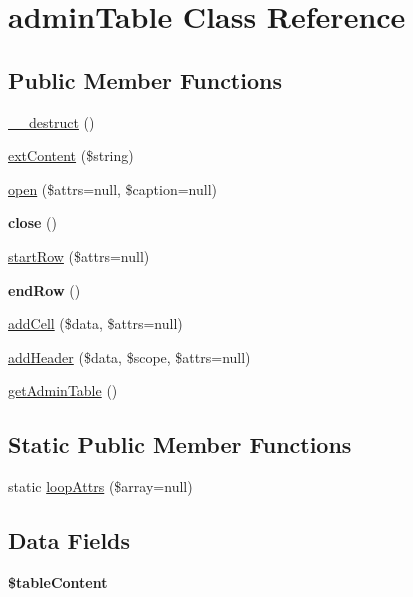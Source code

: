 \hypertarget{classadmin_table}{\section{admin\-Table Class Reference}
\label{classadmin_table}
}
\subsection*{Public Member Functions}
\begin{DoxyCompactItemize}
\item 
\hyperlink{classadmin_table_a421831a265621325e1fdd19aace0c758}{\-\_\-\-\_\-destruct} ()
\item 
\hyperlink{classadmin_table_afc8bf0c1f21257cd2d21b35b5dbc8d1d}{ext\-Content} (\$string)
\item 
\hyperlink{classadmin_table_a651d5c29adc27cf6b70fa3933be19e65}{open} (\$attrs=null, \$caption=null)
\item 
\hypertarget{classadmin_table_aa69c8bf1f1dcf4e72552efff1fe3e87e}{{\bfseries close} ()}\label{classadmin_table_aa69c8bf1f1dcf4e72552efff1fe3e87e}

\item 
\hyperlink{classadmin_table_a16688e2805ae884e7461d990d0356d84}{start\-Row} (\$attrs=null)
\item 
\hypertarget{classadmin_table_a44f7a42a4c3124cdc891a652d4151c45}{{\bfseries end\-Row} ()}\label{classadmin_table_a44f7a42a4c3124cdc891a652d4151c45}

\item 
\hyperlink{classadmin_table_ab365746c9c55275a4eea6d9caf6839bc}{add\-Cell} (\$data, \$attrs=null)
\item 
\hyperlink{classadmin_table_a47ca9b833a64c69e547037fd5d4bd13e}{add\-Header} (\$data, \$scope, \$attrs=null)
\item 
\hyperlink{classadmin_table_a5820ab2aef4c260bddabb31d48ad401f}{get\-Admin\-Table} ()
\end{DoxyCompactItemize}
\subsection*{Static Public Member Functions}
\begin{DoxyCompactItemize}
\item 
static \hyperlink{classadmin_table_a6491743d4cc73aa4d7e6d49af520bc0a}{loop\-Attrs} (\$array=null)
\end{DoxyCompactItemize}
\subsection*{Data Fields}
\begin{DoxyCompactItemize}
\item 
\hypertarget{classadmin_table_acef6509db378f94442f49933d6826396}{{\bfseries \$table\-Content}}\label{classadmin_table_acef6509db378f94442f49933d6826396}

\end{DoxyCompactItemize}


